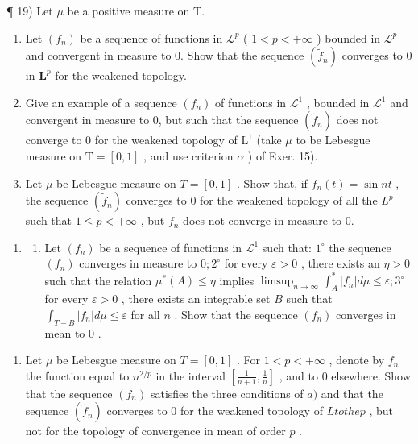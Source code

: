 ¶ 19) Let \(\mu\) be a positive measure on T.

\begin{enumerate}
\def\labelenumi{\alph{enumi})}
\item
  Let \((f_n)\) be a sequence of functions in \(\mathcal{L}^p\) ( \(1 < p < +\infty\) ) bounded in \(\mathcal{L}^p\) and convergent in measure to 0. Show that the sequence \((\widetilde{f}_n)\) converges to 0 in \(\mathbf{L}^p\) for the weakened topology.
\item
  Give an example of a sequence \((f_n)\) of functions in \(\mathcal{L}^1\) , bounded in \(\mathcal{L}^1\) and convergent in measure to 0, but such that the sequence \((\widetilde{f}_n)\) does not converge to 0 for the weakened topology of \(\mathrm{L}^1\) (take \(\mu\) to be Lebesgue measure on \(\mathrm{T} = [0,1]\) , and use criterion \(\alpha\) ) of Exer. 15).
\item
  Let \(\mu\) be Lebesgue measure on \(T = [0,1]\) . Show that, if \(f_{n}(t) = \sin nt\) , the sequence \((\widetilde{f}_n)\) converges to 0 for the weakened topology of all the \(L^{p}\) such that \(1 \leqslant p < +\infty\) , but \(f_{n}\) does not converge in measure to 0.
\end{enumerate}

\begin{enumerate}
\def\labelenumi{\arabic{enumi})}
\setcounter{enumi}{19}
\tightlist
\item
  \begin{enumerate}
  \def\labelenumii{\alph{enumii})}
  \tightlist
  \item
    Let \((f_n)\) be a sequence of functions in \(\mathcal{L}^1\) such that: \(1^\circ\) the sequence \((f_n)\) converges in measure to \(0; 2^\circ\) for every \(\varepsilon > 0\) , there exists an \(\eta > 0\) such that the relation \(\mu^*(A) \leqslant \eta\) implies \(\limsup_{n \to \infty} \int_A^* |f_n| d\mu \leqslant \varepsilon; 3^\circ\) for every \(\varepsilon > 0\) , there exists an integrable set \(B\) such that \(\int_{T - B} |f_n| d\mu \leqslant \varepsilon\) for all \(n\) . Show that the sequence \((f_n)\) converges in mean to \(0\) .
  \end{enumerate}
\end{enumerate}

\begin{enumerate}
\def\labelenumi{\alph{enumi})}
\setcounter{enumi}{1}
\tightlist
\item
  Let \(\mu\) be Lebesgue measure on \(T = [0,1]\) . For \(1 < p < +\infty\) , denote by \(f_n\) the function equal to \(n^{2/p}\) in the interval \(\left[\frac{1}{n+1}, \frac{1}{n}\right]\) , and to 0 elsewhere. Show that the sequence \((f_n)\) satisfies the three conditions of \(a)\) and that the sequence \((\widetilde{f}_n)\) converges to 0 for the weakened topology of \(L to the p\) , but not for the topology of convergence in mean of order \(p\) .
\end{enumerate}


